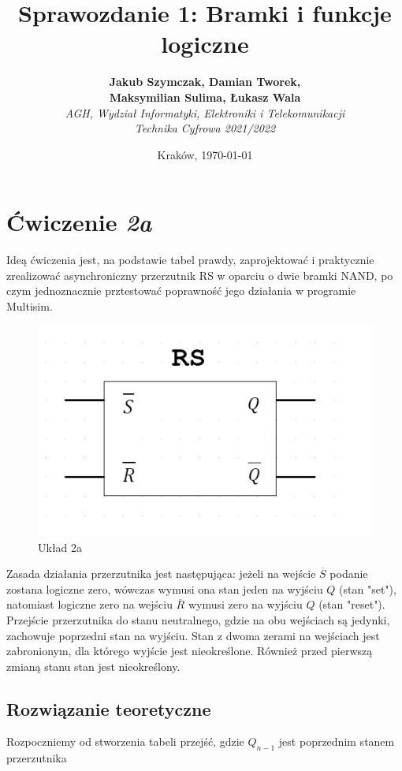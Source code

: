 \documentclass{article}
\title{Sprawozdanie 1: Bramki i funkcje logiczne}
\author{\textbf{Jakub Szymczak, Damian Tworek,}\\ \textbf{Maksymilian Sulima, Łukasz Wala} \\
    \textit{AGH, Wydział Informatyki, Elektroniki i Telekomunikacji} \\
    \textit{Technika Cyfrowa 2021/2022}}
\date{Kraków, \today}
\begin{document}
\maketitle

\section{Ćwiczenie \textit{2a}}
Ideą ćwiczenia jest, na podstawie tabel prawdy, zaprojektować i praktycznie zrealizować asynchroniczny przerzutnik 
RS w oparciu o dwie bramki NAND, po czym jednoznacznie prztestować poprawność jego działania w programie Multisim.

\begin{figure}[H]
    \centering
    \includegraphics[width=\textwidth]{idea_1.png}
    \caption{Układ 2a}
\end{figure}

Zasada działania przerzutnika jest następująca: jeżeli na wejście $\overline{S}$ podanie zostana logiczne zero, wówczas
wymusi ona stan jeden na wyjściu $Q$ (stan "set"), natomiast logiczne zero na wejściu $\overline{R}$ wymusi zero na wyjściu $Q$ (stan "reset"). Przejście przerzutnika
do stanu neutralnego, gdzie na obu wejściach są jedynki, zachowuje poprzedni stan na wyjściu. Stan z dwoma zerami na wejściach
jest zabronionym, dla którego wyjście jest nieokreślone. Również przed pierwszą zmianą stanu stan jest nieokreślony.

\subsection{Rozwiązanie teoretyczne}
Rozpoczniemy od stworzenia tabeli przejść, gdzie $Q_{n-1}$ jest poprzednim stanem przerzutnika
\end{document}
